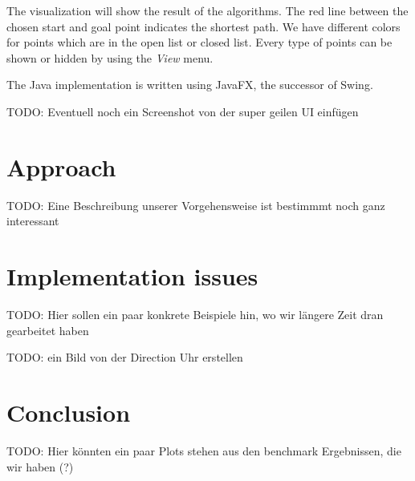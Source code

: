 \documentclass{article}
\begin{document}
    The visualization will show the result of the algorithms. The red line between the chosen start and goal point indicates the shortest path. We have different colors for points which are in the open list or closed list. Every type of points can be shown or hidden by using the \textit{View} menu.
    
    The Java implementation is written using JavaFX, the successor of Swing.
    
    TODO: Eventuell noch ein Screenshot von der super geilen UI einfügen
    
    
    
    \section{Approach}
    TODO: Eine Beschreibung unserer Vorgehensweise ist bestimmmt noch ganz interessant
    
    
    
    \section{Implementation issues}
    TODO: Hier sollen ein paar konkrete Beispiele hin, wo wir längere Zeit dran gearbeitet haben
    
    TODO: ein Bild von der Direction Uhr erstellen
    
    
    
    \section{Conclusion}
    TODO: Hier könnten ein paar Plots stehen aus den benchmark Ergebnissen, die wir haben (?)
    
    
    
    
    
\end{document}
